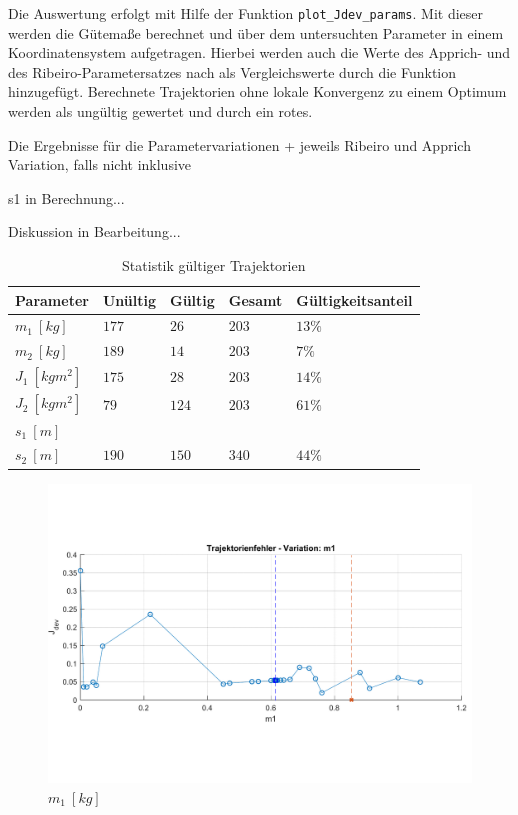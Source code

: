 Die Auswertung erfolgt mit Hilfe der Funktion \texttt{plot\_Jdev\_params}. Mit dieser werden die Gütemaße berechnet und über dem untersuchten Parameter in einem Koordinatensystem aufgetragen. Hierbei werden auch die Werte des Apprich- und des Ribeiro-Parametersatzes nach  als Vergleichswerte durch die Funktion hinzugefügt. Berechnete Trajektorien ohne lokale Konvergenz zu einem Optimum werden als ungültig gewertet und durch ein rotes.


Die Ergebnisse für die Parametervariationen + jeweils Ribeiro und Apprich Variation, falls nicht inklusive

s1 in Berechnung...

Diskussion in Bearbeitung...

\begin{table}[h]
	\centering
		\begin{tabular}{lllll}
			Parameter  & Unültig & Gültig & Gesamt & Gültigkeitsanteil \\
			\midrule
			$m_1 \ [\unit{kg}]$     & $177$ & $26$    & $203$   & $13 \% $ \\
			$m_2 \ [\unit{kg}]$     & $189$ & $14$    & $203$   & $7 \% $ \\
			$J_1 \ [\unit{kgm^2}]$  & $175$ & $28$    & $203$   & $14 \%$ \\
			$J_2 \ [\unit{kgm^2}]$  & $79$  & $124$   & $203$   & $61 \%$ \\
			$s_1 \ [\unit{m}]$      &    & &   &  \\
			$s_2 \ [\unit{m}]$      & $190$ & $150$   & $340$  & $44 \%$ \\

			
		\end{tabular}
	\caption{Statistik gültiger Trajektorien}
	\label{tab:statTrj}
\end{table}


\begin{figure}[htbp]
	\centering
		\includegraphics[width=1.00\textwidth]{Bilder/Trajektorien/m1.pdf}
	\caption{$m_1 \ [kg]$}
	\label{fig:m1}
\end{figure}

